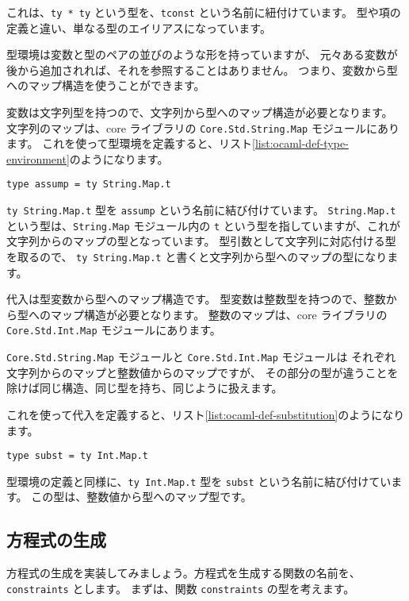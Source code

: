 これは、\texttt{ty * ty} という型を、\texttt{tconst} という名前に紐付けています。
型や項の定義と違い、単なる型のエイリアスになっています。

型環境は変数と型のペアの並びのような形を持っていますが、
元々ある変数が後から追加されれば、それを参照することはありません。
つまり、変数から型へのマップ構造を使うことができます。

変数は文字列型を持つので、文字列から型へのマップ構造が必要となります。
文字列のマップは、core ライブラリの \texttt{Core.Std.String.Map} モジュールにあります。
これを使って型環境を定義すると、リスト\ref{list:ocaml-def-type-environment}のようになります。

\begin{lstlisting}[caption=型環境の定義, label=list:ocaml-def-type-environment]
type assump = ty String.Map.t
\end{lstlisting}

\texttt{ty String.Map.t} 型を \texttt{assump} という名前に結び付けています。
\texttt{String.Map.t} という型は、\texttt{String.Map} モジュール内の \texttt{t}
という型を指していますが、これが文字列からのマップの型となっています。
型引数として文字列に対応付ける型を取るので、
\texttt{ty String.Map.t} と書くと文字列から型へのマップの型になります。

代入は型変数から型へのマップ構造です。
型変数は整数型を持つので、整数から型へのマップ構造が必要となります。
整数のマップは、core ライブラリの \texttt{Core.Std.Int.Map} モジュールにあります。

\texttt{Core.Std.String.Map} モジュールと \texttt{Core.Std.Int.Map} モジュールは
それぞれ文字列からのマップと整数値からのマップですが、
その部分の型が違うことを除けば同じ構造、同じ型を持ち、同じように扱えます。

これを使って代入を定義すると、リスト\ref{list:ocaml-def-substitution}のようになります。

\begin{lstlisting}[caption=代入の定義, label=list:ocaml-def-substitution]
type subst = ty Int.Map.t
\end{lstlisting}

型環境の定義と同様に、\texttt{ty Int.Map.t} 型を \texttt{subst} という名前に結び付けています。
この型は、整数値から型へのマップ型です。

\subsection{方程式の生成}

方程式の生成を実装してみましょう。方程式を生成する関数の名前を、\texttt{constraints} とします。
まずは、関数 \texttt{constraints} の型を考えます。

